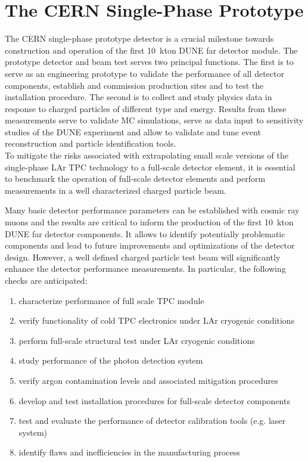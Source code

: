 \section{The CERN Single-Phase Prototype} 
\label{sec:proto-cern-single}


The CERN single-phase prototype detector is a crucial milestone towards construction and operation of the 
first 10~kton DUNE far detector module. The prototype detector and beam test serves two principal functions. 
The first is to serve as an engineering prototype to validate the performance of all detector components,
establish and commission production sites and to test the installation procedure. 
The second is to collect and study physics data in response to charged particles of different type and energy. 
Results from these measurements serve to validate MC simulations, serve as data input to sensitivity studies 
of the DUNE experiment  and allow to validate and tune event reconstruction and particle identification tools.\\
To mitigate the risks associated with extrapolating small scale versions of the single-phase LAr TPC technology 
to a full-scale detector element, it is essential to benchmark the operation of full-scale detector elements
and perform measurements in a well characterized charged particle beam.  


Many basic detector performance parameters can be established with cosmic ray muons and the results are critical to inform 
the production of the first 10~kton DUNE far detector components.
It allows to identify potentially problematic components and lead to future improvements and optimizations of the detector design.
However, a well defined charged particle test beam will significantly enhance the detector performance measurements.
In particular, the following checks are anticipated:
\begin{enumerate}
 \item characterize performance of full scale TPC module
 \item verify functionality of cold TPC electronics under LAr cryogenic conditions
 \item perform full-scale structural test under LAr cryogenic conditions
 \item study performance of the photon detection system
 \item verify argon contamination levels and associated mitigation procedures
 \item develop and test installation procedures for full-scale detector components
 \item test and evaluate the performance of detector calibration tools (e.g. laser system)
 \item identify flaws and inefficiencies in the manufacturing process
\end{enumerate}

